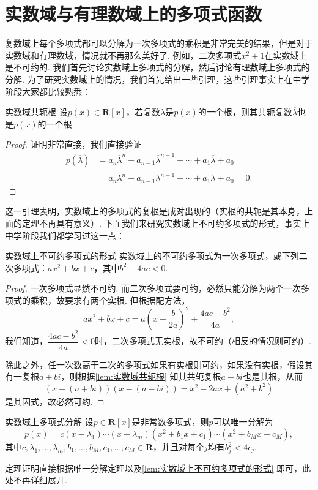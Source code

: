 \section{实数域与有理数域上的多项式函数}
复数域上每个多项式都可以分解为一次多项式的乘积是非常完美的结果，但是对于实数域和有理数域，情况就不再那么美好了. 例如，二次多项式$x^2+1$在实数域上是不可约的. 我们首先讨论实数域上多项式的分解，然后讨论有理数域上多项式的分解. 为了研究实数域上的情况，我们首先给出一些引理，这些引理事实上在中学阶段大家都比较熟悉：
\begin{lemma}{}{实数域共轭根}
    设$p(x)\in\mathbf{R}[x]$，若复数$\lambda$是$p(x)$的一个根，则其共轭复数$\overline{\lambda}$也是$p(x)$的一个根.
\end{lemma}
\begin{proof}
    证明非常直接，我们直接验证
    \begin{align*}
        p(\overline{\lambda}) & =a_n\overline{\lambda}^n+a_{n-1}\overline{\lambda}^{n-1}+\cdots+a_1\overline{\lambda}+a_0 \\
                              & =\overline{a_n\lambda^n+a_{n-1}\lambda^{n-1}+\cdots+a_1\lambda+a_0}=0.
    \end{align*}
\end{proof}
这一引理表明，实数域上的多项式的复根是成对出现的（实根的共轭是其本身，上面的定理不再具有意义）. 下面我们来研究实数域上不可约多项式的形式，事实上中学阶段我们都学习过这一点：
\begin{lemma}{}{实数域上不可约多项式的形式}
    实数域上的不可约多项式为一次多项式，或下列二次多项式：$ax^2+bx+c$，其中$b^2-4ac<0$.
\end{lemma}
\begin{proof}
    一次多项式显然不可约. 而二次多项式要可约，必然只能分解为两个一次多项式的乘积，故要求有两个实根. 但根据配方法，
    \[ax^2+bx+c=a\left(x+\dfrac{b}{2a}\right)^2+\dfrac{4ac-b^2}{4a},\]
    我们知道，$\dfrac{4ac-b^2}{4a}<0$时，二次多项式无实根，故不可约（相反的情况则可约）.

    除此之外，任一次数高于二次的多项式如果有实根则可约，如果没有实根，假设其有一复根$a+bi$，则根据\autoref{lem:实数域共轭根} 知其共轭复根$a-bi$也是其根，从而
    \[(x-(a+bi))(x-(a-bi))=x^2-2ax+(a^2+b^2)\]
    是其因式，故必然可约.
\end{proof}

\begin{theorem}{}{实数域上多项式分解}
    设$p\in\mathbf{R}[x]$是非常数多项式，则$p$可以唯一分解为
    \[p(x)=c(x-\lambda_1)\cdots(x-\lambda_m)(x^2+b_1x+c_1)\cdots(x^2+b_Mx+c_M),\]
    其中$c,\lambda_1,\ldots,\lambda_m,b_1,\ldots,b_M,c_1,\ldots,c_M\in\mathbf{R}$，并且对每个$j$均有$b_j^2<4c_j$.
\end{theorem}
定理证明直接根据唯一分解定理以及\autoref{lem:实数域上不可约多项式的形式} 即可，此处不再详细展开.

